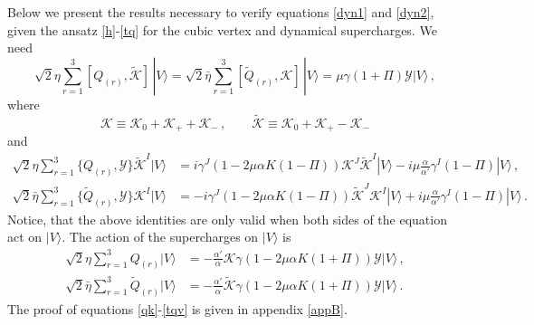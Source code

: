 \documentclass[12pt]{article}
\def\a{\alpha}
\def\g{\gamma}
\def\m{\mu}
\def\mc{\mathcal}
\def\ra{\rangle}
\def\wt{\widetilde}
\numberwithin{equation}{section} \setlength{\textwidth}{17cm}
\begin{document}
\noindent
Below we present the results necessary to verify equations
\eqref{dyn1} and \eqref{dyn2}, given the ansatz \eqref{h}-\eqref{tq} for the cubic vertex and 
dynamical supercharges.
We need
\begin{equation}\label{qk}
\sqrt{2}\eta\sum_{r=1}^3[Q_{(r)},\wt{\mc K}]\,|V\ra=
\sqrt{2}\bar{\eta}\sum_{r=1}^3[\wt{Q}_{(r)},{\mc K}]\,|V\ra=
\m\g(1+\Pi){\mc Y}|V\ra\,,
\end{equation}
where
\begin{equation}
{\mc K}\equiv{\mc K}_0+{\mc K}_++{\mc K}_-\,,\qquad
\wt{\mc K}\equiv{\mc K}_0+{\mc K}_+-{\mc K}_-
\end{equation}
and
\begin{equation}\label{qy}
\begin{split}
\sqrt{2}\eta\sum_{r=1}^3\{Q_{(r)},{\mc Y}\}\wt{\mc K}^I|V\ra 
& =
i\g^J(1-2\m\a K(1-\Pi)){\mc K}^J\wt{\mc K}^I|V\ra-i\m\frac{\a}{\a'}\g^I(1-\Pi)|V\ra\,,\\
\sqrt{2}\bar{\eta}\sum_{r=1}^3\{\wt{Q}_{(r)},{\mc Y}\}{\mc 
K}^I|V\ra & =
-i\g^J(1-2\m\a K(1-\Pi))\wt{\mc K}^J{\mc K}^I|V\ra+i\m\frac{\a}{\a'}\g^I(1-\Pi)|V\ra\,.
\end{split}
\end{equation}
Notice, that the above identities are only valid when both sides of the equation act on $|V\ra$.
The action of the supercharges on $|V\ra$ is 
\begin{align}
\label{qv}
\sqrt{2}\eta\sum_{r=1}^3Q_{(r)}|V\ra & =
-\frac{\a'}{\a}{\mc K}\g(1-2\m\a K(1+\Pi)){\mc Y}|V\ra\,,\\
\label{tqv}
\sqrt{2}\bar{\eta}\sum_{r=1}^3\wt{Q}_{(r)}|V\ra & =
-\frac{\a'}{\a}\wt{\mc K}\g(1-2\m\a K(1+\Pi)){\mc Y}|V\ra\,.
\end{align}
The proof of equations \eqref{qk}-\eqref{tqv} is given in appendix \ref{appB}. 
\end{document}
